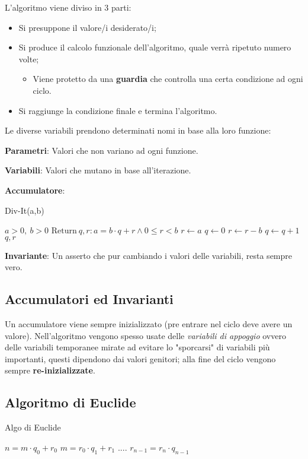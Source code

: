 \documentclass[twocolumn]{article}
\newcommand{\definition}[1]{\begin{mycolorbox}[colback=colorone]
\fontfamily{qcr}\selectfont #1 \fontfamily{cmr}\selectfont
\end{mycolorbox}}
\begin{document}
L'algoritmo viene diviso in 3 parti:
\begin{itemize}
    \item Si presuppone il valore/i desiderato/i;
    \item Si produce il calcolo funzionale dell'algoritmo, quale verrà ripetuto numero volte;
    \begin{itemize}
        \item Viene protetto da una \textbf{guardia} che controlla una certa condizione ad ogni ciclo.
    \end{itemize}
    \item Si raggiunge la condizione finale e termina l'algoritmo.
\end{itemize}
Le diverse variabili prendono determinati nomi in base alla loro funzione:
\definition{\textbf{Parametri}: Valori che non variano ad ogni funzione.}
\definition{\textbf{Variabili}: Valori che mutano in base all'iterazione.}
\definition{\textbf{Accumulatore}:}
\begin{algorithm}
    \caption{Div-It(a,b)}
    \begin{algorithmic}
    \REQUIRE $a>0, \: b>0$
    \ENSURE $\text{Return} \: q,r : a = b\cdot q +r \land 0 \leq r < b$
        \STATE $r \leftarrow a$ 
        \STATE $q \leftarrow 0$
            \STATE $r \leftarrow r-b$ 
            \STATE $q \leftarrow q+1$
        \ENDWHILE
        \STATE {}
        \RETURN $q,r$
    \end{algorithmic}
\end{algorithm}
\definition{\textbf{Invariante}: Un asserto che pur cambiando i valori delle variabili, resta sempre vero.}
\subsection{Accumulatori ed Invarianti}
Un accumulatore viene sempre inizializzato (pre entrare nel ciclo deve avere un valore). Nell'algoritmo vengono spesso usate delle \textit{variabili di appoggio} ovvero delle variabili temporanee mirate ad evitare lo "sporcarsi" di variabili più importanti, questi dipendono dai valori genitori; alla fine del ciclo vengono sempre \textbf{re-inizializzate}.
\subsection{Algoritmo di Euclide}
\begin{algorithm}
    \caption{Algo di Euclide}
    \begin{algorithmic}
        \STATE $n = m \cdot q_0 + r_0$ 
        \STATE $m = r_0 \cdot q_1 + r_1$ 
        \STATE $....$
        \STATE $r_{n-1} = r_n \cdot q_{n-1}$ 
    \end{algorithmic}
\end{algorithm}
\clearpage
\setcounter{section}{0}
\end{document}
